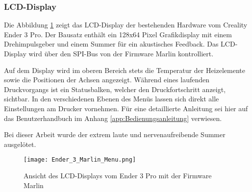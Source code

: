 \subsubsection{LCD-Display}
\label{sec:Anzeige}

Die Abbildung \ref{pic:Ender3_Display} zeigt das LCD-Display der bestehenden Hardware vom Creality Ender 3 Pro.
Der Bausatz enthält ein 128x64 Pixel Grafikdisplay mit einem Drehimpulsgeber und einem Summer für ein akustisches Feedback.
Das LCD-Display wird über den SPI-Bus von der Firmware Marlin kontrolliert.

Auf dem Display wird im oberen Bereich stets die Temperatur der Heizelemente sowie die Positionen der Achsen angezeigt.
Während eines laufenden Druckvorgangs ist ein Statusbalken, welcher den Druckfortschritt anzeigt, sichtbar.
In den verschiedenen Ebenen des Menüs lassen sich direkt alle Einstellungen am Drucker vornehmen. Für eine detaillierte Anleitung sei hier auf das Benutzerhandbuch im Anhang \ref{app:Bedienungsanleitung} verwiesen.

Bei dieser Arbeit wurde der extrem laute und nervenaufreibende Summer ausgelötet.

\begin{figure}[H]
	\centering
	\texttt{[image: Ender\_3\_Marlin\_Menu.png]}
	\caption{Ansicht des LCD-Displays vom Ender 3 Pro mit der Firmware Marlin}
	\label{pic:Ender3_Display}
\end{figure}
